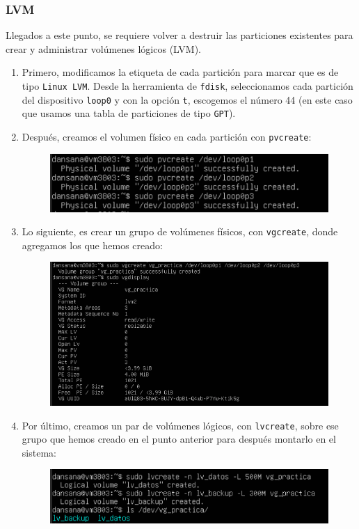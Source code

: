 \documentclass[10pt]{article}
\begin{document}
	\subsubsection{LVM}
	Llegados a este punto, se requiere volver a destruir las particiones existentes para crear y administrar volúmenes lógicos (LVM).
	\begin{enumerate}
		\item Primero, modificamos la etiqueta de cada partición para marcar que es de tipo \verb|Linux LVM|. Desde la herramienta de \verb|fdisk|, seleccionamos cada partición del dispositivo \verb|loop0| y con la opción \verb|t|, escogemos el número 44 (en este caso que usamos una tabla de particiones de tipo \verb|GPT|).
		\item Después, creamos el volumen físico en cada partición con \verb|pvcreate|:
		\begin{figure}[H]
			\setlength{\abovecaptionskip}{0cm}
			\setlength{\belowcaptionskip}{0cm}
			\centering
			\includegraphics[width=0.6\linewidth]{Recursos/pvcreate.png}
		\end{figure}
		\item Lo siguiente, es crear un grupo de volúmenes físicos, con \verb|vgcreate|, donde agregamos los que hemos creado:
		\begin{figure}[H]
			\setlength{\abovecaptionskip}{0cm}
			\setlength{\belowcaptionskip}{0cm}
			\centering
			\includegraphics[width=0.6\linewidth]{Recursos/vgcreate.png}
		\end{figure}
		\item Por último, creamos un par de volúmenes lógicos, con \verb|lvcreate|, sobre ese grupo que hemos creado en el punto anterior para después montarlo en el sistema:
		\begin{figure}[H]
			\setlength{\abovecaptionskip}{0cm}
			\setlength{\belowcaptionskip}{0cm}
			\centering
			\includegraphics[width=0.6\linewidth]{Recursos/lvcreate.png}

\end{figure}
\end{enumerate}
\end{document}
